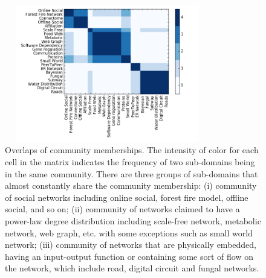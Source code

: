 \begin{figure}[ht]
		\begin{center}
		\vspace{0.5cm}
		\includegraphics[clip,width=9cm,height = 6cm]{figs/overlaps.png}
		\vspace{0.5cm}
		\caption{Overlaps of community memberships. The intensity of color for each cell in the matrix indicates the frequency of two sub-domains being in the same community.  There are three groups of sub-domains that almost constantly share the community membership: (i) community of social networks including online social, forest fire model, offline social, and so on; (ii) community of networks claimed to have a power-law degree distribution including scale-free network, metabolic network, web graph, etc. with some exceptions such as small world network; (iii) community of networks that are physically embedded, having an input-output function or containing some sort of flow on the network, which include road, digital circuit and fungal networks.}
		\label{community_overlaps}
 		\end{center}
\end{figure}



